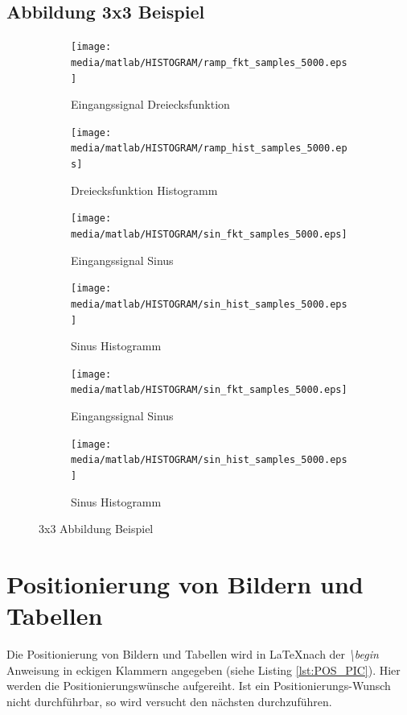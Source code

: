 \documentclass[TGAI_Laborbericht.tex]{subfiles}
\begin{document}
\subsection{Abbildung 3x3 Beispiel}
\begin{figure}[!ht]
	\begin{subfigure}{.499\textwidth}
		\centering\small
		\texttt{[image: media/matlab/HISTOGRAM/ramp\_fkt\_samples\_5000.eps]}
		\caption{Eingangssignal Dreiecksfunktion}
	\end{subfigure}\label{fig:GRUNDL_RAMP_RAMP_3X3}
	\begin{subfigure}{.499\textwidth}
		\centering\small
		\texttt{[image: media/matlab/HISTOGRAM/ramp\_hist\_samples\_5000.eps]}
		\caption{Dreiecksfunktion Histogramm}
		\label{fig:GRUNDL_RAMP_HIST_3X3}
	\end{subfigure}
	\begin{subfigure}{.499\textwidth}
		\centering\small
		\texttt{[image: media/matlab/HISTOGRAM/sin\_fkt\_samples\_5000.eps]}
		\caption{Eingangssignal Sinus}
		\label{fig:GRUNDL_SIN_SIN_3X3}
	\end{subfigure}%
	\begin{subfigure}{.499\textwidth}
		\centering\small
		\texttt{[image: media/matlab/HISTOGRAM/sin\_hist\_samples\_5000.eps]}
		\caption{Sinus Histogramm}
		\label{fig:GRUNDL_SIN_HIST_3X3}	
	\end{subfigure}
	\begin{subfigure}{.499\textwidth}
		\centering\small
		\texttt{[image: media/matlab/HISTOGRAM/sin\_fkt\_samples\_5000.eps]}
		\caption{Eingangssignal Sinus}
		\label{fig:GRUNDL_SIN_SIN_A_3X3}
	\end{subfigure}%
	\begin{subfigure}{.499\textwidth}
		\centering\small
		\texttt{[image: media/matlab/HISTOGRAM/sin\_hist\_samples\_5000.eps]}
		\caption{Sinus Histogramm}
		\label{fig:GRUNDL_SIN_HIST_A_3X3}
	\end{subfigure}	
\caption{3x3 Abbildung Beispiel}
\label{fig:GRUNDL_RAMP_SIN_HIST}
\end{figure}
\newpage

\section{Positionierung von Bildern und Tabellen}
Die Positionierung von Bildern und Tabellen wird in \LaTeX nach der \textit{\textbackslash begin} Anweisung in eckigen Klammern angegeben (siehe Listing \ref{lst:POS_PIC}). Hier werden die Positionierungswünsche aufgereiht. Ist ein Positionierungs-Wunsch nicht durchführbar, so wird versucht den nächsten durchzuführen.
\end{document}
